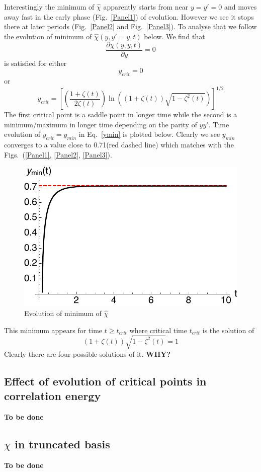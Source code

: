 \documentclass{article}
\newcommand{\eq}{\begin{equation}}
\newcommand{\qe}{\end{equation}}
\begin{document}
Interestingly the minimum of $\hat{\chi}$ apparently starts from near $y=y'=0$ and moves away fast in the early phase (Fig.~\ref{Panel1}) of evolution. However we see it stops there at later periods (Fig.~\ref{Panel2} and Fig.~\ref{Panel3}). To analyse that we follow the evolution of minimum of $\hat{\chi}(y, y'=y, t)$ below. We find that 
\eq
\frac{\partial \hat{\chi}(y, y, t)}{\partial y} = 0
\qe
is satisfied for either
\eq
y_{crit}=0
\qe
or
\eq\label{ymin}
y_{crit}= \left[ \left(\frac{1+\zeta(t)}{2\zeta(t)}\right) \ln((1+\zeta(t))\sqrt{1-\zeta^2(t)})\right]^{1/2}
\qe
The first critical point is a saddle point in longer time while the second is a minimum/maximum in longer time depending on the parity of $y y'$.
Time evolution of $y_{crit} = y_{min}$ in Eq.~\eqref{ymin} is plotted below. Clearly we see $y_{min}$ converges to a value close to 0.71(red dashed line) which matches with the Figs.~(\ref{Panel1}, \ref{Panel2}, \ref{Panel3}). 
\begin{figure}[H]
\begin{center}
   \includegraphics[scale=0.7]{plots/Yminevolution.pdf} 
  \caption{Evolution of minimum of $\hat{\chi}$}
  \label{ymin}
 \end{center}
\end{figure}  
This minimum appears for time $t \geq t_{crit}$ where critical time  $t_{crit}$ is the solution of 
\eq
(1+\zeta(t))\sqrt{1-\zeta^2(t)} = 1
\qe
Clearly there are four possible solutions of it. \textbf{WHY?}
\subsection{Effect of evolution of critical points in correlation energy}
\textbf{To be done}
\subsection{$\chi$ in truncated basis}
\textbf{To be done}
\end{document}
